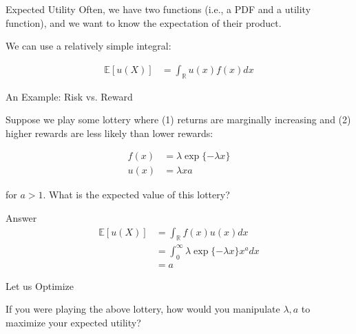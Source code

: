 \documentclass[10pt]{beamer}
\begin{document}
\begin{frame}{Expected Utility}
Often, we have two functions (i.e., a PDF and a utility function), and we want to know the expectation of their product.

We can use a relatively simple integral:

\begin{align*}
    \mathbb{E}[u(X)] &= \int_\mathbb{R} u(x) f(x) dx
\end{align*}

\end{frame}

\begin{frame}{An Example: Risk vs. Reward}

Suppose we play some lottery where (1) returns are marginally increasing and (2) higher rewards are less likely than lower rewards:

\begin{align*}
    f(x) &= \lambda \exp \{- \lambda x\} \\
    u(x) &= \lambda x a
\end{align*}

 for $a > 1$. What is the expected value of this lottery?

\end{frame}

\begin{frame}{Answer}
\begin{align*}
    \mathbb{E}[u(X)] &= \int_\mathbb{R} f(x) u(x) dx \\
    &= \int_0^\infty \lambda \exp \{- \lambda x\} x^a dx \\
    &= a
\end{align*}
\end{frame}

\begin{frame}{Let us Optimize}

If you were playing the above lottery, how would you manipulate $\lambda,a$ to maximize your expected utility?

\end{frame}
\end{document}
